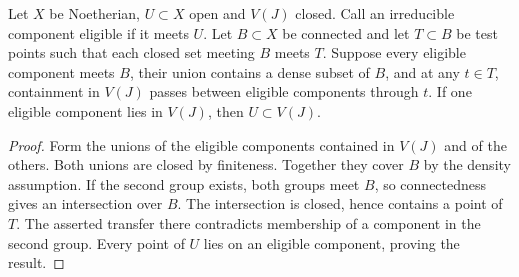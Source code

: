 \begin{lemma}\label{cprop:global}
Let \(X\) be Noetherian, \(U\subset X\) open and \(V(J)\) closed.
Call an irreducible component eligible if it meets \(U\).
Let \(B\subset X\) be connected and let \(T\subset B\) be test points
such that each closed set meeting \(B\) meets \(T\).
Suppose every eligible component meets \(B\), their union contains
a dense subset of \(B\), and at any \(t\in T\), containment in
\(V(J)\) passes between eligible components through \(t\).
If one eligible component lies in \(V(J)\), then \(U\subset V(J)\).
\end{lemma}
\begin{proof}
Form the unions of the eligible components contained in \(V(J)\)
and of the others. Both unions are closed by finiteness. Together
they cover \(B\) by the density assumption. If the second group
exists, both groups meet \(B\), so connectedness gives an intersection
over \(B\). The intersection is closed, hence contains a point of
\(T\). The asserted transfer there contradicts membership of a
component in the second group. Every point of \(U\) lies on an
eligible component, proving the result.
\end{proof}

